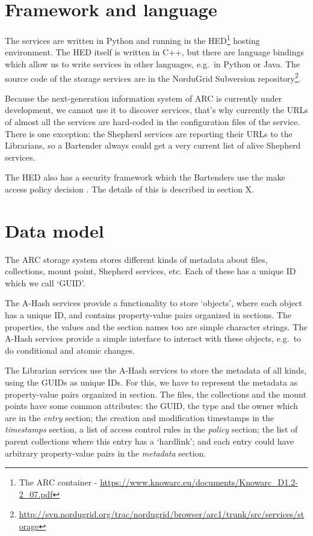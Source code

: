 \documentclass{book}
\begin{document}
\section{Framework and language} %
\label{sec:framework_and_language}

The services are written in Python and running in the HED\footnote{The ARC container - \url{https://www.knowarc.eu/documents/Knowarc\_D1.2-2\_07.pdf}} hosting environment. The HED itself is written in C++, but there are language bindings which allow us to write services in other languages, e.g.~in Python or Java. The source code of the storage services are in the NorduGrid Subversion repository\footnote{\url{http://svn.nordugrid.org/trac/nordugrid/browser/arc1/trunk/src/services/storage}}.

Because the next-generation information system of ARC is currently under development, we cannot use it to discover services, that's why currently the URLs of almost all the services are hard-coded in the configuration files of the service. There is one exception: the Shepherd services are reporting their URLs to the Librarians, so a Bartender always could get a very current list of alive Shepherd services.

The HED also has a security framework which the Bartenders use the make access policy decision . The details of this is described in section X.


\section{Data model} %
\label{sec:data_model}

The ARC storage system stores different kinds of metadata about files, collections, mount point, Shepherd services, etc. Each of these has a unique ID which we call `GUID'.

The A-Hash services provide a functionality to store `objects', where each object has a unique ID, and contains property-value pairs organized in sections. The properties, the values and the section names too are simple character strings. The A-Hash services provide a simple interface to interact with these objects, e.g.~to do conditional and atomic changes.

The Librarian services use the A-Hash services to store the metadata of all kinds, using the GUIDs as unique IDs. For this, we have to represent the metadata as property-value pairs organized in section. The files, the collections and the mount points have some common attributes: the GUID, the type and the owner which are in the \emph{entry} section; the creation and modification timestamps in the \emph{timestamps} section, a list of access control rules in the \emph{policy} section; the list of parent collections where this entry has a `hardlink'; and each entry could have arbitrary property-value pairs in the \emph{metadata} section.
\end{document}
